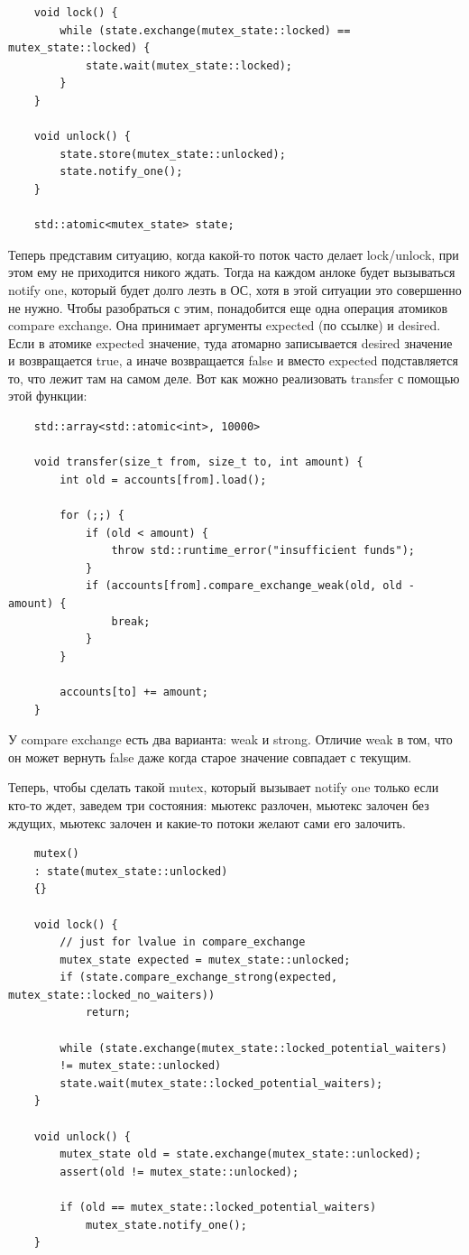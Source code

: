 \documentclass[12pt, a4paper]{article}
\begin{document}
\begin{verbatim}
	void lock() {
		while (state.exchange(mutex_state::locked) == mutex_state::locked) {
			state.wait(mutex_state::locked);
		}
	}
	
	void unlock() {
		state.store(mutex_state::unlocked);
		state.notify_one();
	}
	
	std::atomic<mutex_state> state;
\end{verbatim}
Теперь представим ситуацию, когда какой-то поток часто делает lock/unlock, при этом ему не приходится никого ждать. Тогда на каждом анлоке будет вызываться notify one, который будет долго лезть в ОС, хотя в этой ситуации это совершенно не нужно. Чтобы разобраться с этим, понадобится еще одна операция атомиков compare exchange. Она принимает аргументы expected (по ссылке) и desired. Если в атомике expected значение, туда атомарно записывается desired значение и возвращается true, а иначе возвращается false и вместо expected подставляется то, что лежит там на самом деле. Вот как можно реализовать transfer с помощью этой функции:
\begin{verbatim}
	std::array<std::atomic<int>, 10000>
	
	void transfer(size_t from, size_t to, int amount) {
		int old = accounts[from].load();
		
		for (;;) {
			if (old < amount) {
				throw std::runtime_error("insufficient funds");
			}
			if (accounts[from].compare_exchange_weak(old, old - amount) {
				break;
			}
		}
		
		accounts[to] += amount;
	}
\end{verbatim}
У compare exchange есть два варианта: weak и strong. Отличие weak в том, что он может вернуть false даже когда старое значение совпадает с текущим.
\par Теперь, чтобы сделать такой mutex, который вызывает notify one только если кто-то ждет, заведем три состояния: мьютекс разлочен, мьютекс залочен без ждущих, мьютекс залочен и какие-то потоки желают сами его залочить. 
\begin{verbatim}
	mutex()
	: state(mutex_state::unlocked)
	{}
	
	void lock() {
		// just for lvalue in compare_exchange
		mutex_state expected = mutex_state::unlocked;
		if (state.compare_exchange_strong(expected, mutex_state::locked_no_waiters))
			return;
		
		while (state.exchange(mutex_state::locked_potential_waiters) 
		!= mutex_state::unlocked)
		state.wait(mutex_state::locked_potential_waiters);
	}
	
	void unlock() {
		mutex_state old = state.exchange(mutex_state::unlocked);
		assert(old != mutex_state::unlocked);
		
		if (old == mutex_state::locked_potential_waiters)
			mutex_state.notify_one();
	}
\end{verbatim}
\end{document}
